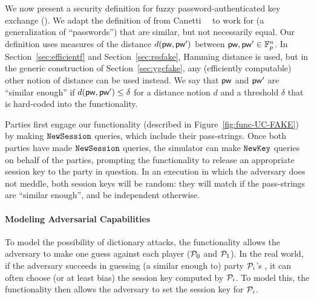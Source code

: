
We now present a security definition for fuzzy password-authenticated key exchange (\FAKE). 
We adapt the definition of \PAKE from Canetti~\etal~\cite{EC:CHKLM05} to work for \passwords (a generalization of ``passwords'') that are similar, but not necessarily equal. 
Our definition uses measures of the distance $d(\mathsf{pw}, \mathsf{pw}')$ between \passwords $\mathsf{pw}, \mathsf{pw}' \in\mathbb{F}_{p}^{n}$.
In Section~\ref{sec:efficientf} and Section~\ref{sec:rssfake}, Hamming distance is used, but in the generic construction of Section~\ref{sec:ygcfake}, any (efficiently computable) other notion of distance can be used instead.
We say that $\mathsf{pw}$ and $\mathsf{pw}'$ are ``similar enough'' if $d(\mathsf{pw}, \mathsf{pw}') \leq \delta$ for a distance notion $d$ and a threshold $\delta$ that is hard-coded into the functionality.

Parties first engage our functionality (described in Figure~\ref{fig:func-UC-FAKE}) by making $\texttt{NewSession}$ queries, which include their pass-strings.
Once both parties have made $\texttt{NewSession}$ queries, the simulator can make $\texttt{NewKey}$ queries on behalf of the parties, prompting the functionality to release an appropriate session key to the party in question.
In an execution in which the adversary does not meddle, both session keys will be random: they will match if the pass-strings are ``similar enough'', and be independent otherwise.

\paragraph{Modeling Adversarial Capabilities}
To model the possibility of dictionary attacks, the functionality allows the adversary to make one \password guess against each player ($\mathcal{P}_{0}$ and $\mathcal{P}_{1}$). 
In the real world, if the adversary succeeds in guessing (a \password similar enough to) party $\mathcal{P}_{i}$'s \password, 
it can often choose (or at least bias) the session key computed by $\mathcal{P}_{i}$.
To model this, the functionality then allows the adversary to set the session key for $\mathcal{P}_{i}$.

